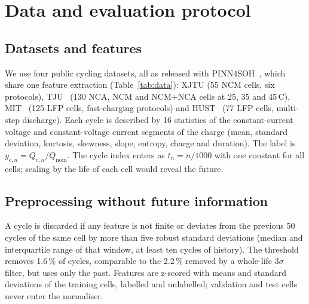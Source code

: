 \documentclass[11pt,a4paper]{article}
\begin{document}
\section{Data and evaluation protocol}\label{sec:data}

\subsection{Datasets and features}
We use four public cycling datasets, all as released with PINN4SOH~\citep{wang2024}, which share one feature
extraction (Table~\ref{tab:data}): XJTU (55 NCM cells, six protocols), TJU~\citep{zhu2022} (130 NCA, NCM and NCM+NCA
cells at 25, 35 and 45\,\textdegree C), MIT~\citep{severson2019} (125 LFP cells, fast-charging protocols) and
HUST~\citep{ma2022} (77 LFP cells, multi-step discharge). Each cycle is described by 16 statistics of the
constant-current voltage and constant-voltage current segments of the charge (mean, standard deviation, kurtosis,
skewness, slope, entropy, charge and duration). The label is $y_{c,n} = Q_{c,n}/Q_\text{nom}$. The cycle index enters as
$t_n = n/1000$ with one constant for all cells; scaling by the life of each cell would reveal the future.



\subsection{Preprocessing without future information}
A cycle is discarded if any feature is not finite or deviates from the previous 50 cycles of the same cell by more
than five robust standard deviations (median and interquartile range of that window, at least ten cycles of history).
The threshold removes 1.6\,\% of cycles, comparable to the 2.2\,\% removed by a whole-life $3\sigma$ filter, but uses
only the past. Features are z-scored with means and standard deviations of the training cells, labelled and
unlabelled; validation and test cells never enter the normaliser.
\end{document}
